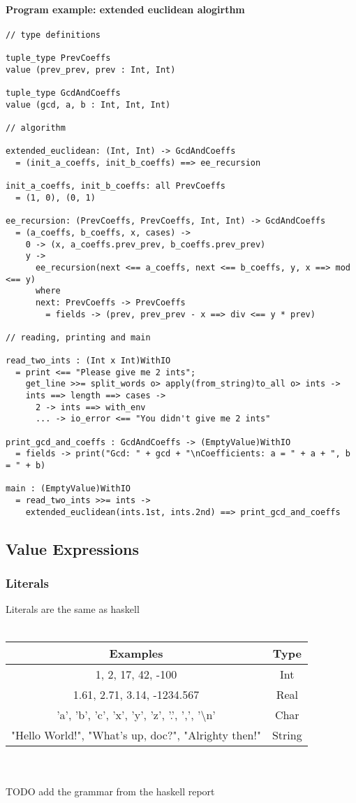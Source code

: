\documentclass{article}
\begin{document}
\paragraph{Program example: extended euclidean alogirthm}
\begin{verbatim}
// type definitions

tuple_type PrevCoeffs
value (prev_prev, prev : Int, Int)

tuple_type GcdAndCoeffs
value (gcd, a, b : Int, Int, Int)

// algorithm

extended_euclidean: (Int, Int) -> GcdAndCoeffs
  = (init_a_coeffs, init_b_coeffs) ==> ee_recursion

init_a_coeffs, init_b_coeffs: all PrevCoeffs
  = (1, 0), (0, 1)

ee_recursion: (PrevCoeffs, PrevCoeffs, Int, Int) -> GcdAndCoeffs
  = (a_coeffs, b_coeffs, x, cases) ->
    0 -> (x, a_coeffs.prev_prev, b_coeffs.prev_prev)
    y ->
      ee_recursion(next <== a_coeffs, next <== b_coeffs, y, x ==> mod <== y)
      where
      next: PrevCoeffs -> PrevCoeffs
        = fields -> (prev, prev_prev - x ==> div <== y * prev)

// reading, printing and main

read_two_ints : (Int x Int)WithIO
  = print <== "Please give me 2 ints";
    get_line >>= split_words o> apply(from_string)to_all o> ints ->
    ints ==> length ==> cases ->
      2 -> ints ==> with_env
      ... -> io_error <== "You didn't give me 2 ints"
 
print_gcd_and_coeffs : GcdAndCoeffs -> (EmptyValue)WithIO
  = fields -> print("Gcd: " + gcd + "\nCoefficients: a = " + a + ", b = " + b)

main : (EmptyValue)WithIO
  = read_two_ints >>= ints ->
    extended_euclidean(ints.1st, ints.2nd) ==> print_gcd_and_coeffs
\end{verbatim}

\subsection{Value Expressions}

\subsubsection{Literals}

Literals are the same as haskell \\ \\
\begin{tabular}{ |c|c| } 
\hline
Examples & Type \\ 
\hline
\hline
1, 2, 17, 42, -100 & Int \\ 
\hline
1.61, 2.71, 3.14, -1234.567 & Real \\ 
\hline
'a', 'b', 'c', 'x', 'y', 'z', '.', ',', '\textbackslash n' & Char \\
\hline
"Hello World!", "What's up, doc?", "Alrighty then!" & String \\
\hline
\end{tabular}
\\\\
TODO add the grammar from the haskell report
\end{document}

